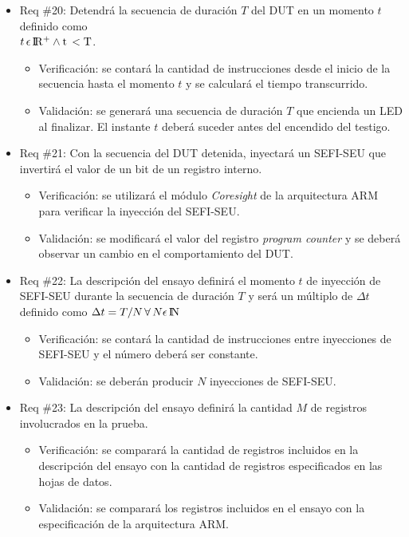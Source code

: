 \documentclass[
11pt, %
]{charter}
\begin{document}
\begin{itemize}
\item Req \#20: Detendrá la secuencia de duración $ T $ del DUT en un momento $ t $ definido como \\ $ t \, \epsilon \, \rm I\!R^+ \wedge t \, < T$.
\begin{itemize}
    \item Verificación: se contará la cantidad de instrucciones desde el inicio de la secuencia hasta el momento $ t $ y se calculará el tiempo transcurrido.
    \item Validación: se generará una secuencia de duración $ T $ que encienda un LED al finalizar. El instante $ t $ deberá suceder antes del encendido del testigo.
\end{itemize}

\item Req \#21: Con la secuencia del DUT detenida, inyectará un SEFI-SEU que invertirá el valor de un bit de un registro interno.
\begin{itemize}
    \item Verificación: se utilizará el módulo \emph{Coresight} de la arquitectura ARM para verificar la inyección del SEFI-SEU.
    \item Validación: se modificará el valor del registro \emph{program counter} y se deberá observar un cambio en el comportamiento del DUT.
\end{itemize}

\item Req \#22: La descripción del ensayo definirá el momento $ t $ de inyección de SEFI-SEU durante la secuencia de duración $ T $ y será un múltiplo de $\Delta t$ definido como $ \Delta t=T/N \, \forall \, N \epsilon \, \rm I\!N $
\begin{itemize}
    \item Verificación: se contará la cantidad de instrucciones entre inyecciones de SEFI-SEU y el número deberá ser constante.
    \item Validación: se deberán producir $ N $ inyecciones de SEFI-SEU.
\end{itemize}

\item Req \#23: La descripción del ensayo definirá la cantidad $ M $ de registros involucrados en la prueba.
\begin{itemize}
    \item Verificación: se comparará la cantidad de registros incluidos en la descripción del ensayo con la cantidad de registros especificados en las hojas de datos.
    \item Validación: se comparará los registros incluidos en el ensayo con la especificación de la arquitectura ARM.
\end{itemize}


\end{itemize}
\end{document}
